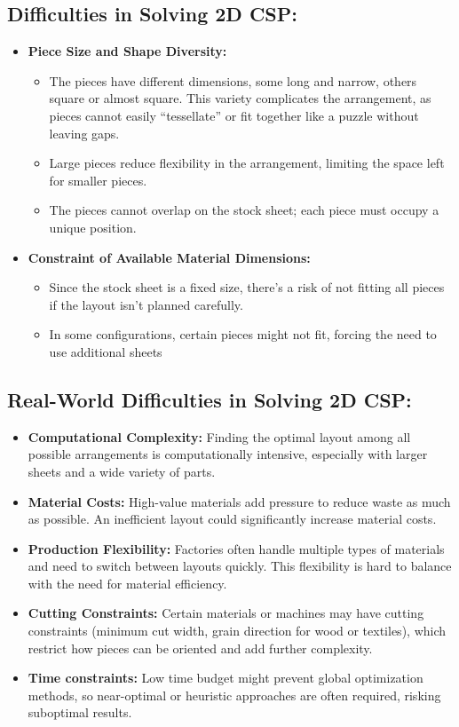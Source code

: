 \documentclass[a4paper]{article}
\begin{document}
\subsection{Difficulties in Solving 2D CSP:}
\begin{itemize}
    
    \item \textbf{Piece Size and Shape Diversity:}
    \begin{itemize}
        \item The pieces have different dimensions, some long and narrow, others square or almost square. This variety complicates the arrangement, as pieces cannot easily “tessellate” or fit together like a puzzle without leaving gaps.
        \item Large pieces reduce flexibility in the arrangement, limiting the space left for smaller pieces.
        \item The pieces cannot overlap on the stock sheet; each piece must occupy a unique position.
    \end{itemize}
    \item \textbf{Constraint of Available Material Dimensions:}
    \begin{itemize}
        \item Since the stock sheet is a fixed size, there's a risk of not fitting all pieces if the layout isn’t planned carefully.
        \item In some configurations, certain pieces might not fit, forcing the need to use additional sheets
    \end{itemize}
    
\end{itemize}

\subsection{Real-World Difficulties in Solving 2D CSP:}
\begin{itemize}
    \item \textbf{Computational Complexity:} Finding the optimal layout among all possible arrangements is computationally intensive, especially with larger sheets and a wide variety of parts.
    \item \textbf{Material Costs:} High-value materials add pressure to reduce waste as much as possible. An inefficient layout could significantly increase material costs.
    \item \textbf{Production Flexibility:} Factories often handle multiple types of materials and need to switch between layouts quickly. This flexibility is hard to balance with the need for material efficiency.
    \item \textbf{Cutting Constraints:} Certain materials or machines may have cutting constraints (minimum cut width, grain direction for wood or textiles), which restrict how pieces can be oriented and add further complexity.
    \item \textbf{Time constraints:} Low time budget might prevent global optimization methods, so near-optimal or heuristic approaches are often required, risking suboptimal results.
\end{itemize}
\end{document}
